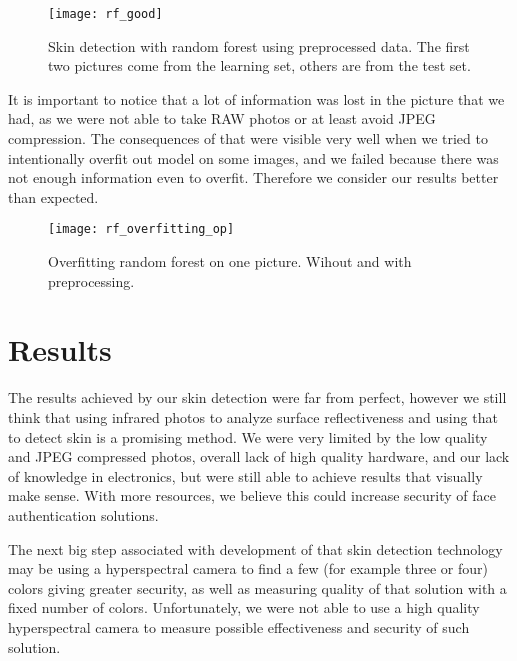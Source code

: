                 \begin{figure}[H]
                    \caption{Skin detection with random forest using preprocessed data.
                    The first two pictures come from the learning set, others
                    are from the test set.}
                    \centering
                    \texttt{[image: rf\_good]}
                    \label{fig:rf_good}
                \end{figure}

                It is important to notice that a lot of information was lost in the
                picture that we had, as we were not able to take RAW photos or at least
                avoid JPEG compression.
                The consequences of that were visible very well when we tried to
                intentionally overfit out model on some images, and we failed
                because there was not enough information even to overfit.
                Therefore we consider our results better than expected.

                 \begin{figure}[H]
                    \caption{Overfitting random forest on one picture. Wihout and with preprocessing.}
                    \centering
                    \texttt{[image: rf\_overfitting\_op]}
                    \label{fig:rf_overfitting_op}
                \end{figure}

    \pagebreak

    \section{Results}
        The results achieved by our skin detection were far from perfect,
        however we still think that using infrared photos to analyze surface
        reflectiveness and using that to detect skin is a promising method.
        We were very limited by the low quality and JPEG compressed photos,
        overall lack of high quality hardware, and our lack of knowledge in electronics,
        but were still able to achieve results that visually make sense.
        With more resources, we believe this could increase security of
        face authentication solutions.

        The next big step associated with development of that skin detection
        technology may be using a hyperspectral camera to find a few (for example three
        or four) colors giving greater security, as well as measuring
        quality of that solution with a fixed number of colors.
        Unfortunately, we were not able to use a high quality hyperspectral camera
        to measure possible effectiveness and security of such solution.

